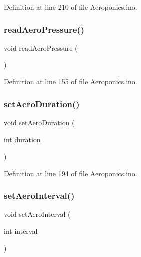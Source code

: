 Definition at line 210 of file Aeroponics.\+ino.

\mbox{\label{_aeroponics_8ino_a932274759d0784478203f2e863206f95}} 
\subsubsection{\texorpdfstring{readAeroPressure()}{readAeroPressure()}}
{\footnotesize\ttfamily void read\+Aero\+Pressure (\begin{DoxyParamCaption}{ }\end{DoxyParamCaption})}



Definition at line 155 of file Aeroponics.\+ino.

\mbox{\label{_aeroponics_8ino_adcb385a6c69e09ad4ad1dd3cc1637694}} 
\subsubsection{\texorpdfstring{setAeroDuration()}{setAeroDuration()}}
{\footnotesize\ttfamily void set\+Aero\+Duration (\begin{DoxyParamCaption}\item[{int}]{duration }\end{DoxyParamCaption})}



Definition at line 194 of file Aeroponics.\+ino.

\mbox{\label{_aeroponics_8ino_a6dd8d8bfdded279feb03a4192844b54f}} 
\subsubsection{\texorpdfstring{setAeroInterval()}{setAeroInterval()}}
{\footnotesize\ttfamily void set\+Aero\+Interval (\begin{DoxyParamCaption}\item[{int}]{interval }\end{DoxyParamCaption})}



